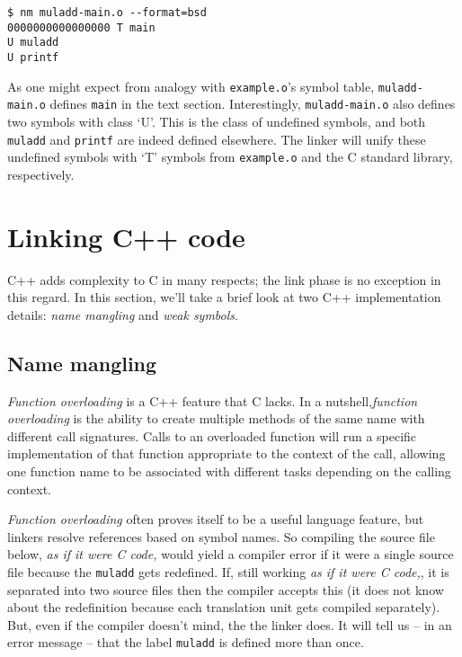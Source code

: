 \documentclass[12pt,a4paper]{article}
\newcommand{\C}{C}
\newcommand{\Cpp}{C++}
\newcommand{\labelname}[1]{\texttt{#1}}
\newcommand{\filename}[1]{\texttt{#1}}
\begin{document}
\begin{lstlisting}[caption=listing all symbols in \filename{muladd-main.o}]
$ nm muladd-main.o --format=bsd
0000000000000000 T main
U muladd
U printf
\end{lstlisting}

As one might expect from analogy with \filename{example.o}'s symbol table, \filename{muladd-main.o} defines \labelname{main} in the text section. Interestingly, \filename{muladd-main.o} also defines two symbols with class `U'. This is the class of undefined symbols, and both \labelname{muladd} and \labelname{printf} are indeed defined elsewhere. The linker will unify these undefined symbols with `T' symbols from \filename{example.o} and the \C{} standard library, respectively.

\section{Linking \Cpp{} code}
\label{sec:linking-cpp}

\Cpp{} adds complexity to \C{} in many respects; the link phase is no exception in this regard. In this section, we'll take a brief look at two \Cpp{} implementation details: \emph{name mangling} and \emph{weak symbols}.

\subsection{Name mangling}

\emph{Function overloading} is a \Cpp{} feature that \C{} lacks. In a nutshell,\emph{function overloading} is the ability to create multiple methods of the same name with different call signatures. Calls to an overloaded function will run a specific implementation of that function appropriate to the context of the call, allowing one function name to be associated with different tasks depending on the calling context.

\emph{Function overloading} often proves itself to be a useful language feature, but linkers resolve references based on symbol names. So compiling the source file below, \emph{as if it were \C{} code,} would yield a compiler error if it were a single source file because the \labelname{muladd} gets redefined. If, still working \emph{as if it were \C{} code,}, it is separated into two source files then the compiler accepts this (it does not know about the redefinition because each translation unit gets compiled separately). But, even if the compiler doesn't mind, the the linker does. It will tell us -- in an error message -- that the label \labelname{muladd} is defined more than once.\\
\end{document}

